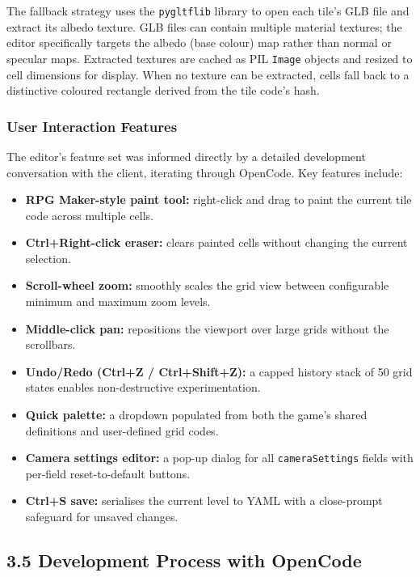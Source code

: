 The fallback strategy uses the \texttt{pygltflib} library to open each
tile's GLB file and extract its albedo texture. GLB files can contain
multiple material textures; the editor specifically targets the albedo
(base colour) map rather than normal or specular maps. Extracted
textures are cached as PIL \texttt{Image} objects and resized to cell
dimensions for display. When no texture can be extracted, cells fall
back to a distinctive coloured rectangle derived from the tile code's
hash.

\subsubsection{User Interaction
Features}\label{user-interaction-features}

The editor's feature set was informed directly by a detailed development
conversation with the client, iterating through OpenCode. Key features
include:

\begin{itemize}
\tightlist
\item
  \textbf{RPG Maker-style paint tool:} right-click and drag to paint the
  current tile code across multiple cells.
\item
  \textbf{Ctrl+Right-click eraser:} clears painted cells without
  changing the current selection.
\item
  \textbf{Scroll-wheel zoom:} smoothly scales the grid view between
  configurable minimum and maximum zoom levels.
\item
  \textbf{Middle-click pan:} repositions the viewport over large grids
  without the scrollbars.
\item
  \textbf{Undo/Redo (Ctrl+Z / Ctrl+Shift+Z):} a capped history stack of
  50 grid states enables non-destructive experimentation.
\item
  \textbf{Quick palette:} a dropdown populated from both the game's
  shared definitions and user-defined grid codes.
\item
  \textbf{Camera settings editor:} a pop-up dialog for all
  \texttt{cameraSettings} fields with per-field reset-to-default
  buttons.
\item
  \textbf{Ctrl+S save:} serialises the current level to YAML with a
  close-prompt safeguard for unsaved changes.
\end{itemize}

\subsection{3.5 Development Process with
OpenCode}\label{development-process-with-opencode}

